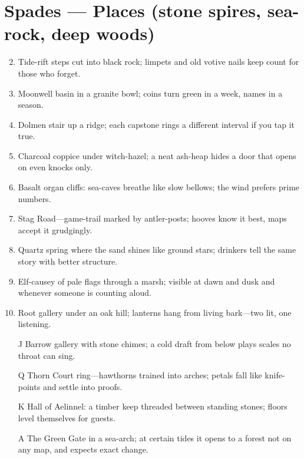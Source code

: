 \section{Spades --- Places (stone spires, sea-rock, deep woods)}
\label{sec:aelinnel-places}
\begin{enumerate}
\setcounter{enumi}{1}
\item Tide-rift steps cut into black rock; limpets and old votive nails keep count for those who forget.
\item Moonwell basin in a granite bowl; coins turn green in a week, names in a season.
\item Dolmen stair up a ridge; each capstone rings a different interval if you tap it true.
\item Charcoal coppice under witch-hazel; a neat ash-heap hides a door that opens on even knocks only.
\item Basalt organ cliffs: sea-caves breathe like slow bellows; the wind prefers prime numbers.
\item Stag Road---game-trail marked by antler-posts; hooves know it best, maps accept it grudgingly.
\item Quartz spring where the sand shines like ground stars; drinkers tell the same story with better structure.
\item Elf-causey of pale flags through a marsh; visible at dawn and dusk and whenever someone is counting aloud.
\item Root gallery under an oak hill; lanterns hang from living bark---two lit, one listening.
\item[J] Barrow gallery with stone chimes; a cold draft from below plays scales no throat can sing.
\item[Q] Thorn Court ring---hawthorns trained into arches; petals fall like knife-points and settle into proofs.
\item[K] Hall of Aelinnel: a timber keep threaded between standing stones; floors level themselves for guests.
\item[A] The Green Gate in a sea-arch; at certain tides it opens to a forest not on any map, and expects exact change.
\end{enumerate}

